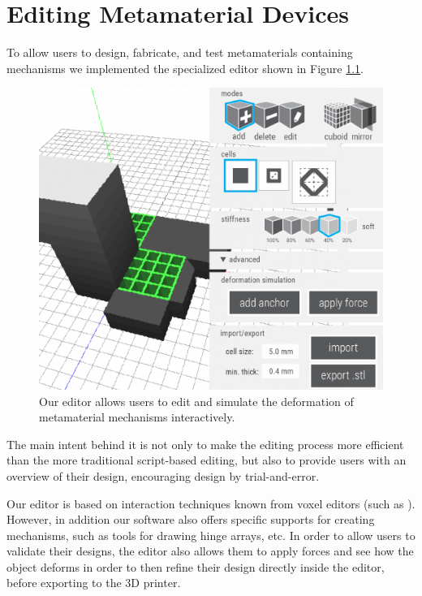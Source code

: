 \chapter{Editing Metamaterial Devices}
\label{chapter:software}


To allow users to design, fabricate, and test metamaterials containing mechanisms we implemented the specialized editor shown in Figure \ref{fig:20-editor-ui}. 

\begin{figure} [h]
    \includegraphics[width=\textwidth]{chapters/metamaterial-mechanisms-FIG/20-editor-ui.pdf}
    \caption[Short figure name.]{Our editor allows users to edit and simulate the deformation of metamaterial mechanisms interactively. 
    \label{fig:20-editor-ui}}
\end{figure}

The main intent behind it is not only to make the editing process more efficient than the more traditional script-based editing, but also to provide users with an overview of their design, encouraging design by trial-and-error. 

Our editor is based on interaction techniques known from voxel editors (such  as \cite{VoxCAD2018}). However, in addition our software also offers specific supports for creating mechanisms, such as tools for drawing hinge arrays, etc. In order to allow users to validate their designs, the editor also allows them to apply forces and see how the object deforms in order to then refine their design directly inside the editor, before exporting to the 3D printer.

